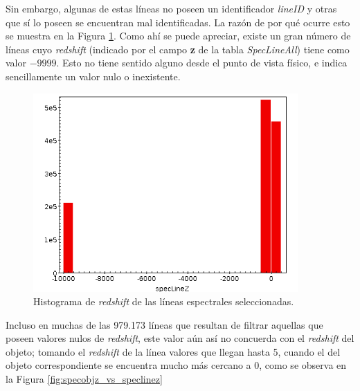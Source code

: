 Sin embargo, algunas de estas líneas no poseen un identificador \textit{lineID} y otras que sí lo poseen se encuentran mal identificadas. La razón de por qué ocurre esto se muestra en la Figura \ref{fig:speclinez_hist}. Como ahí se puede apreciar, existe un gran número de líneas cuyo \textit{redshift} (indicado por el campo \textbf{z} de la tabla \textit{SpecLineAll}) tiene como valor ${-9999}$. Esto no tiene sentido alguno desde el punto de vista físico, e indica sencillamente un valor nulo o inexistente.

\begin{figure}[h!]
\begin{center}
\includegraphics[width=0.9\textwidth]{imagenes/speclinez_hist.png}
\end{center}
\vspace*{-5mm}
\caption{Histograma de \textit{redshift} de las líneas espectrales seleccionadas.}
\label{fig:speclinez_hist}
\end{figure}

Incluso en muchas de las 979.173 líneas que resultan de filtrar aquellas que poseen valores nulos de \textit{redshift}, este valor aún así no concuerda con el \textit{redshift} del objeto; tomando el \textit{redshift} de la línea valores que llegan hasta 5, cuando el del objeto correspondiente se encuentra mucho más cercano a 0, como se observa en la Figura \ref{fig:specobjz_vs_speclinez}

